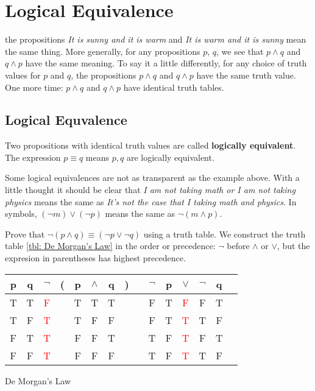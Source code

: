 \chapter{Logical Equivalence} 
 the propositions {\itshape It is sunny and it is warm} and
{\itshape It is warm and it is sunny} mean the same thing. More generally, for any
propositions $p$, $q$, we see that $p\land q$ and $q\land p$ have the same meaning. To say it a little differently,
for any choice of truth values for $p$ and $q$, the propositions  $p\land q$ and 
$q\land p$ have the
same truth value. One more time: $p\land q$ and $q\land p$ have identical truth tables.

\section{Logical Equvalence}
Two propositions with identical truth values are called {\bfseries logically equivalent}.
The expression $p\equiv q$ means $p,q$ are logically equivalent. 

Some logical equivalences are not as transparent as the example above. With a little thought
it should be clear that {\itshape I am not taking math or I am not taking physics} means the same as
{\itshape It's not the case that I taking math and physics}. In symbols, $(\lnot m)\lor(\lnot p)$ means the
same as $\lnot(m\land p)$.

\begin{exmp}[De Morgan] Prove that
$\lnot(p\land q)\equiv (\lnot p \lor \lnot q)$ using a truth table. We construct the truth table \ref{tbl: De Morgan's Law} in the order
or precedence: $\lnot$ before $\land$ or $\lor$, but the expresion in parentheses has highest precedence.

\begin{margintable}[-1.0cm]
\begin{tabular}{@{ }c@{ }@{ }c | c@{ }@{}c@{}@{ }c@{ }@{ }c@{ }@{ }c@{ }@{}c@{ } | c@{ }@{ }c@{ }@{ }c@{ }@{ }c@{ }@{ }c@{ }@{ }c@{ }@{ }c}
p & q & $\lnot$ & ( & p & $\land$ & q & ) &  & $\lnot$ & p & $\lor$ & $\lnot$ & q & \\
\hline 
T & T & \textcolor{red}{F} &  & T & T & T &  &  & F & T & \textcolor{red}{F} & F & T & \\
T & F & \textcolor{red}{T} &  & T & F & F &  &  & F & T & \textcolor{red}{T} & T & F & \\
F & T & \textcolor{red}{T} &  & F & F & T &  &  & T & F & \textcolor{red}{T} & F & T & \\
F & F & \textcolor{red}{T} &  & F & F & F &  &  & T & F & \textcolor{red}{T} & T & F & \\
\end{tabular}\label{tbl: De Morgan's Law}
\caption{De Morgan's Law}
\end{margintable}
\end{exmp} 


